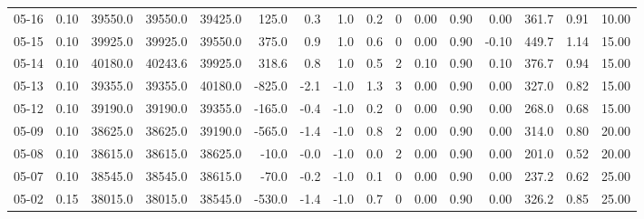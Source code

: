 \begin{threeparttable}
{\begin{tabular}{lrrrrrrrrrrrrrrr}
  05-16 &     0.10 & 39550.0 & 39550.0 & 39425.0 &      125.0 &            0.3 &                      1.0 &                 0.2 &              0 &       0.00 &      0.90 &           0.00 &            361.7 &            0.91 &                  10.00 \\
  05-15 &     0.10 & 39925.0 & 39925.0 & 39550.0 &      375.0 &            0.9 &                      1.0 &                 0.6 &              0 &       0.00 &      0.90 &          -0.10 &            449.7 &            1.14 &                  15.00 \\
  05-14 &     0.10 & 40180.0 & 40243.6 & 39925.0 &      318.6 &            0.8 &                      1.0 &                 0.5 &              2 &       0.10 &      0.90 &           0.10 &            376.7 &            0.94 &                  15.00 \\
  05-13 &     0.10 & 39355.0 & 39355.0 & 40180.0 &     -825.0 &           -2.1 &                     -1.0 &                 1.3 &              3 &       0.00 &      0.90 &           0.00 &            327.0 &            0.82 &                  15.00 \\
  05-12 &     0.10 & 39190.0 & 39190.0 & 39355.0 &     -165.0 &           -0.4 &                     -1.0 &                 0.2 &              0 &       0.00 &      0.90 &           0.00 &            268.0 &            0.68 &                  15.00 \\
  05-09 &     0.10 & 38625.0 & 38625.0 & 39190.0 &     -565.0 &           -1.4 &                     -1.0 &                 0.8 &              2 &       0.00 &      0.90 &           0.00 &            314.0 &            0.80 &                  20.00 \\
  05-08 &     0.10 & 38615.0 & 38615.0 & 38625.0 &      -10.0 &           -0.0 &                     -1.0 &                 0.0 &              2 &       0.00 &      0.90 &           0.00 &            201.0 &            0.52 &                  20.00 \\
  05-07 &     0.10 & 38545.0 & 38545.0 & 38615.0 &      -70.0 &           -0.2 &                     -1.0 &                 0.1 &              0 &       0.00 &      0.90 &           0.00 &            237.2 &            0.62 &                  25.00 \\
  05-02 &     0.15 & 38015.0 & 38015.0 & 38545.0 &     -530.0 &           -1.4 &                     -1.0 &                 0.7 &              0 &       0.00 &      0.90 &           0.00 &            326.2 &            0.85 &                  25.00 \\

\end{tabular}}
\end{threeparttable}
